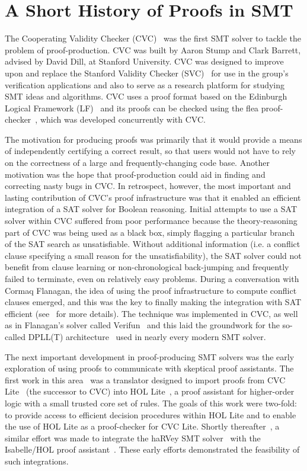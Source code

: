 \documentclass{llncs}
\begin{document}
\section{A Short History of Proofs in SMT}
\label{sec:history}
The Cooperating Validity Checker (CVC)~\cite{SBD02} was the first SMT solver to
tackle the problem of proof-production.  CVC was built by Aaron Stump and Clark
Barrett, advised by David Dill, at Stanford University.  CVC was designed to
improve upon and replace the Stanford Validity Checker (SVC)~\cite{BDL96} for
use in the group's verification applications and also to serve as a research
platform for studying SMT ideas and algorithms.    CVC
uses a proof format based on the Edinburgh Logical Framework (LF)~\cite{HHP93}
and its proofs can be checked using the flea proof-checker~\cite{SBD02b,SD02}, which was
developed concurrently with CVC.

The motivation for producing proofs was primarily that it would provide a means
of independently certifying a correct result,
so that users would not have to rely on the correctness of a large and
frequently-changing code base.  Another motivation was the hope that
proof-production could aid in finding and correcting nasty bugs in CVC.
In retrospect, however, the most important and lasting contribution of CVC's
proof infrastructure was that it enabled an efficient integration of a SAT
solver for Boolean reasoning.  Initial attempts to use a SAT solver within
CVC suffered from poor performance because the theory-reasoning part of CVC
was being used as a black box, simply flagging a particular branch of the SAT
search as unsatisfiable.  Without additional information (i.e. a conflict
clause specifying a small reason for the unsatisfiability), the SAT solver could
not benefit from clause learning or non-chronological back-jumping and frequently
failed to terminate, even on relatively easy problems.  During a conversation
with Cormaq Flanagan, the idea of using the proof infrastructure to compute
conflict clauses emerged, and this was the key to finally making the
integration with SAT efficient (see~\cite{BDS02-CAV02} for more details).  The
technique was implemented in CVC, as well as in Flanagan's solver called
Verifun~\cite{FJO+03} and this laid the groundwork for the so-called DPLL(T)
architecture~\cite{NieOT-JACM-06} used in nearly every modern SMT solver.

The next important development in proof-producing SMT solvers was the
early exploration of using proofs to communicate with skeptical proof
assistants.  The first work in this area~\cite{MBG06} was a translator designed
to import proofs from CVC Lite~\cite{BB04} (the successor to CVC) into HOL
Lite~\cite{H96}, a proof assistant for higher-order logic with a small trusted
core set of rules.  The goals of this work were two-fold: to provide access to
efficient decision procedures within HOL Lite and to enable the use of HOL Lite
as a proof-checker for CVC Lite.  Shortly thereafter~\cite{FMM+06,HCF+07}, a similar effort was
made to integrate the haRVey SMT solver~\cite{DR03} with the Isabelle/HOL proof
assistant~\cite{NPW02}. These early efforts demonstrated the feasibility of such
integrations.
\end{document}
